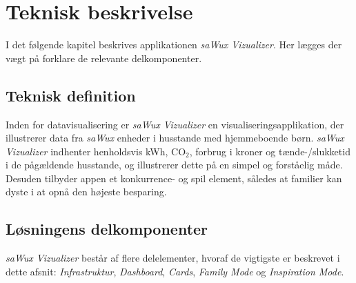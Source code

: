 \chapter{Teknisk beskrivelse}
I det følgende kapitel beskrives applikationen \emph{saWux Vizualizer}. Her lægges der vægt på forklare de relevante delkomponenter.

\section{Teknisk definition}
Inden for datavisualisering er \emph{saWux Vizualizer} en visualiseringsapplikation, der illustrerer data fra \emph{saWux} enheder i husstande med hjemmeboende børn. \emph{saWux Vizualizer} indhenter henholdsvis kWh, CO$_2$, forbrug i kroner og tænde-/slukketid i de pågældende husstande, og illustrerer dette på en simpel og forståelig måde. Desuden tilbyder appen et konkurrence- og spil element, således at familier kan dyste i at opnå den højeste besparing.

\section{Løsningens delkomponenter}
\emph{saWux Vizualizer} består af flere delelementer, hvoraf de vigtigste er beskrevet i dette afsnit: \emph{Infrastruktur}, \emph{Dashboard}, \emph{Cards}, \emph{Family Mode} og \emph{Inspiration Mode}. 

